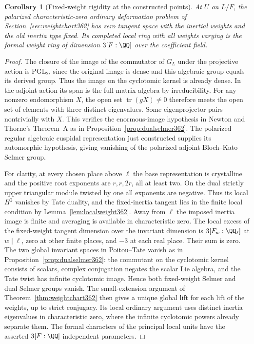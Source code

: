 \documentclass[a4paper,11pt]{article}
\newtheorem{corollary}[proposition]{Corollary}
\theoremstyle{definition}
\theoremstyle{remark}
\numberwithin{equation}{section}
\begin{document}
\begin{corollary}[Fixed-weight rigidity at the constructed points]\leavevmode
\label{cor:seedrigidity436}
At \(U\) on \(L/F\), the polarized characteristic-zero
ordinary deformation problem of Section~\ref{sec:weightchart362}
has zero tangent space with the inertial weights and the
old inertia type fixed. Its completed local ring with all
weights varying is the formal weight ring of dimension
\(3[F:\QQ]\) over the coefficient field.
\end{corollary}
\begin{proof}
The closure of the image of the commutator of \(G_L\) under
the projective action is \(\mathrm{PGL}_2\), since the
original image is dense and this algebraic group equals
its derived group. Thus the image on the cyclotomic kernel
is already dense. In the adjoint action its span is the
full matrix algebra by irreducibility. For any nonzero
endomorphism \(X\), the open set
\(\operatorname{tr}(gX)\ne0\) therefore meets the open
set of elements with three distinct eigenvalues. Some
eigenprojector pairs nontrivially with \(X\). This verifies
the enormous-image hypothesis in Newton and Thorne's
Theorem~A as in Proposition~\ref{prop:dualselmer362}.
The polarized regular algebraic cuspidal representation
just constructed supplies its automorphic hypothesis, giving
vanishing of the polarized adjoint Bloch--Kato Selmer group.
~\cite{XI-VIII-VI-nt119}

For clarity, at every chosen place above \(\ell\) the base
representation is crystalline and the positive root exponents
are \(r,r,2r\), all at least two. On the dual strictly
upper triangular module twisted by one all exponents are
negative. Thus its local \(H^2\) vanishes by Tate duality,
and the fixed-inertia tangent lies in the finite local
condition by Lemma~\ref{lem:localweight362}. Away from
\(\ell\) the imposed inertia image is finite and averaging
is available in characteristic zero. The local excess of
the fixed-weight tangent dimension over the invariant
dimension is \(3[F_w:\QQ_\ell]\) at \(w\mid\ell\), zero
at other finite places, and \(-3\) at each real place.
Their sum is zero. The two global invariant spaces in
Poitou--Tate vanish as in Proposition~\ref{prop:dualselmer362}:
the commutant on the cyclotomic kernel consists of scalars,
complex conjugation negates the scalar Lie algebra, and
the Tate twist has infinite cyclotomic image. Hence both
fixed-weight Selmer and dual Selmer groups vanish. The
small-extension argument of Theorem~\ref{thm:weightchart362}
then gives a unique global lift for each lift of the weights,
up to strict conjugacy. Its local ordinary argument uses
distinct inertia eigenvalues in characteristic zero, where
the infinite cyclotomic powers already separate them. The
formal characters of the principal local units have the
asserted \(3[F:\QQ]\) independent parameters.
\end{proof}
\end{document}
